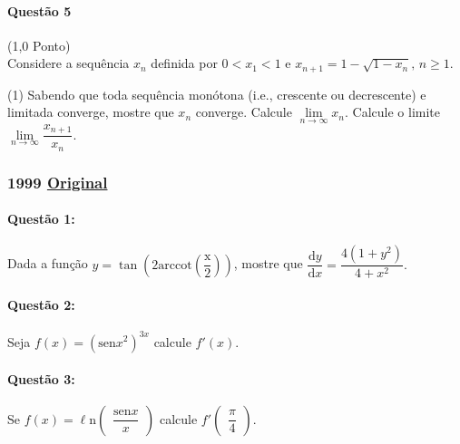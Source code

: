 \documentclass[12pt,a4paper]{article}
\newcommand{\sen}{\mathrm{sen}}
\newcommand{\Ln}{\ell\mathrm{n}}
\newcommand{\original}[1]{\tiny \href{#1}{Original} \normalsize}
\begin{document}
\paragraph{Questão 5} (1,0 Ponto)\\
Considere a sequência ${x_n}$ definida por $0<x_1<1$ e $x_{n+1} = 1 - \sqrt{1-x_{n}},\, n\ge 1$.

\begin{tasks}(1)
\task Sabendo que toda sequência monótona (i.e., crescente ou decrescente) e limitada converge, mostre que ${x_n}$ converge.
\task Calcule $\lim\limits_{n\to \infty} x_n$.
\task Calcule o limite $\lim\limits_{n\to \infty} \dfrac{x_{n+1}}{x_n}$.
\end{tasks}


\newpage

\subsubsection{1999 \original{https://drive.google.com/open?id=1cQN-_Ws-5FsVpCYxmamlsEXPs_JlqTXu}}

\vspace{1cm}

\paragraph{Questão 1:}
Dada a função $y= \tan \left(
2 \mathrm{arccot \left({\dfrac{x}{2}
}\right)}\right)$, mostre que
$\dfrac{\mathrm{d} y}{\mathrm{d} x}= \dfrac{4(1+y^{2})}{4+x^{2}}.$

\vspace{1.5cm}

\paragraph{Questão 2:}
Seja $f(x)=(\sen x^2)^{3x}$ calcule $f'(x)$.

\vspace{1.5cm}

\paragraph{Questão 3:}
Se $f(x)=\Ln\begin{pmatrix}\dfrac{\sen x}{x}\end{pmatrix}$ calcule $f'\begin{pmatrix}
\dfrac{\pi }{4}
\end{pmatrix}$.
\end{document}
